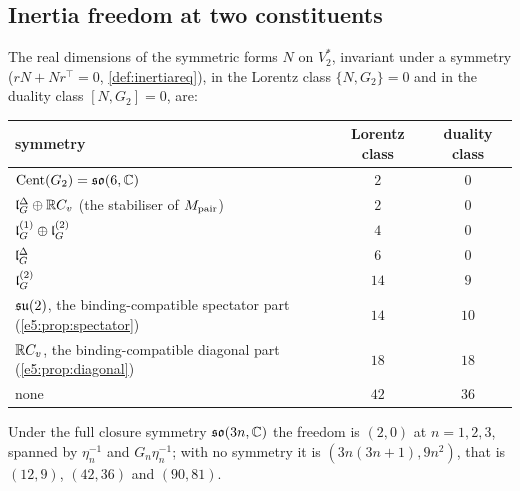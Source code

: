 \subsection{Inertia freedom at two constituents}
\label{e5:sec:inertia}

\begin{theorem}
\label{e5:thm:inertia}
The real dimensions of the symmetric forms $N$ on $V_2^*$, invariant under a symmetry ($rN+Nr^{\!\top}=0$, \cref{def:inertiareq}), in the
Lorentz class $\{N,G_2\}=0$ and in the duality class $[N,G_2]=0$, are:
\begin{center}
\small
\begin{tabular}{@{}lcc@{}}
\toprule
symmetry & Lorentz class & duality class\\
\midrule
$\operatorname{Cent}(G_2)=\mathfrak{so}(6,\mathbb{C})$ & $2$ & $0$\\
$\mathfrak l_G^\Delta\oplus\mathbb{R} C_v$ (the stabiliser of $M_{\rm pair}$) & $2$ & $0$\\
$\mathfrak l_G^{(1)}\oplus\mathfrak l_G^{(2)}$ & $4$ & $0$\\
$\mathfrak l_G^\Delta$ & $6$ & $0$\\
$\mathfrak l_G^{(2)}$ & $14$ & $9$\\
$\mathfrak{su}(2)$, the binding-compatible spectator part (\cref{e5:prop:spectator}) & $14$ & $10$\\
$\mathbb{R} C_v$, the binding-compatible diagonal part (\cref{e5:prop:diagonal}) & $18$ & $18$\\
none & $42$ & $36$\\
\bottomrule
\end{tabular}
\end{center}
Under the full closure symmetry $\mathfrak{so}(3n,\mathbb{C})$ the freedom is $(2,0)$ at $n=1,2,3$, spanned by $\eta_n^{-1}$ and $G_n\eta_n^{-1}$; with no symmetry it is
$(3n(3n+1),9n^2)$, that is $(12,9)$, $(42,36)$ and $(90,81)$.
\end{theorem}

